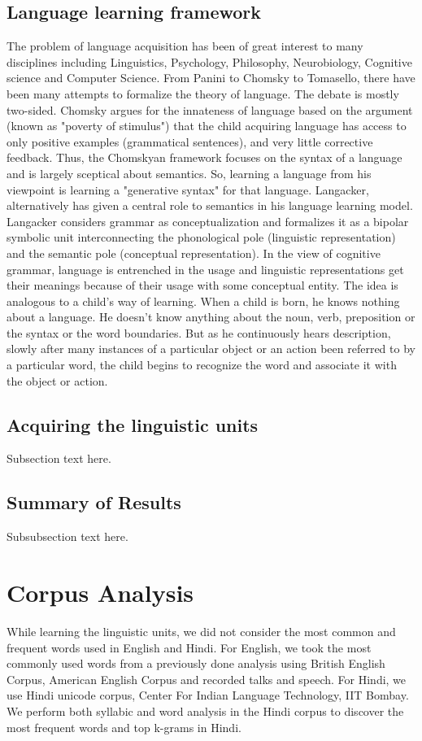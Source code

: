 \documentclass[compsoc]{IEEEtran}
\begin{document}
\subsection{Language learning framework}
The problem of language acquisition has been of great interest to many disciplines including Linguistics, Psychology, Philosophy, Neurobiology, Cognitive science and Computer Science. From Panini\cite{} to Chomsky\cite{} to Tomasello, there have been many attempts to formalize the theory of language. The debate is mostly two-sided. Chomsky\cite{} argues for the innateness of language based on the argument (known as "poverty of stimulus") that the child acquiring language has access to only positive examples (grammatical sentences), and very little corrective feedback. Thus, the Chomskyan framework focuses on the syntax of a language and is largely sceptical about semantics. So, learning a language from his viewpoint is learning a "generative syntax" for that language. Langacker\cite{}, alternatively has given a central role to semantics in his language learning model. Langacker\cite{} considers grammar as conceptualization and formalizes it as a bipolar symbolic unit interconnecting the phonological pole (linguistic representation) and the semantic pole (conceptual representation). In the view of cognitive grammar, language is entrenched in the usage and linguistic representations get their meanings because of their usage with some conceptual entity.
The idea is analogous to a child’s way of learning. When a child is born, he knows nothing about a language. He doesn’t know anything about the noun, verb, preposition or the syntax or the word boundaries. But as he continuously hears description, slowly after many instances of a particular object or an action been referred to by a particular word, the child begins to recognize the word and associate it with the object or action. 

\subsection{Acquiring the linguistic units}
Subsection text here.


\subsection{Summary of Results}
Subsubsection text here.


\section{Corpus Analysis}
While learning the linguistic units, we did not consider the most common and frequent words used in English and Hindi. For English, we took the most commonly used words from a previously done analysis using British English Corpus, American English Corpus and recorded talks and speech\cite{}. For Hindi, we use Hindi unicode corpus, Center For Indian Language Technology, IIT Bombay\cite{}. We perform both syllabic and word analysis in the Hindi corpus to discover the most frequent words and top k-grams in Hindi. 
\end{document}
